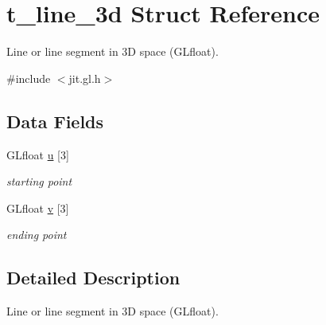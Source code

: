 \hypertarget{structt__line__3d}{
\section{t\_\-line\_\-3d Struct Reference}
\label{structt__line__3d}
}


Line or line segment in 3D space (GLfloat).  


{\ttfamily \#include $<$jit.gl.h$>$}\subsection*{Data Fields}
\begin{DoxyCompactItemize}
\item 
\hypertarget{structt__line__3d_a9858881ea05dbe46b83ec15adb934745}{
GLfloat \hyperlink{structt__line__3d_a9858881ea05dbe46b83ec15adb934745}{u} \mbox{[}3\mbox{]}}
\label{structt__line__3d_a9858881ea05dbe46b83ec15adb934745}

\begin{DoxyCompactList}\small\item\em starting point \item\end{DoxyCompactList}\item 
\hypertarget{structt__line__3d_aacb99500845b467c7a4a6d88cc0619c0}{
GLfloat \hyperlink{structt__line__3d_aacb99500845b467c7a4a6d88cc0619c0}{v} \mbox{[}3\mbox{]}}
\label{structt__line__3d_aacb99500845b467c7a4a6d88cc0619c0}

\begin{DoxyCompactList}\small\item\em ending point \item\end{DoxyCompactList}\end{DoxyCompactItemize}


\subsection{Detailed Description}
Line or line segment in 3D space (GLfloat). 